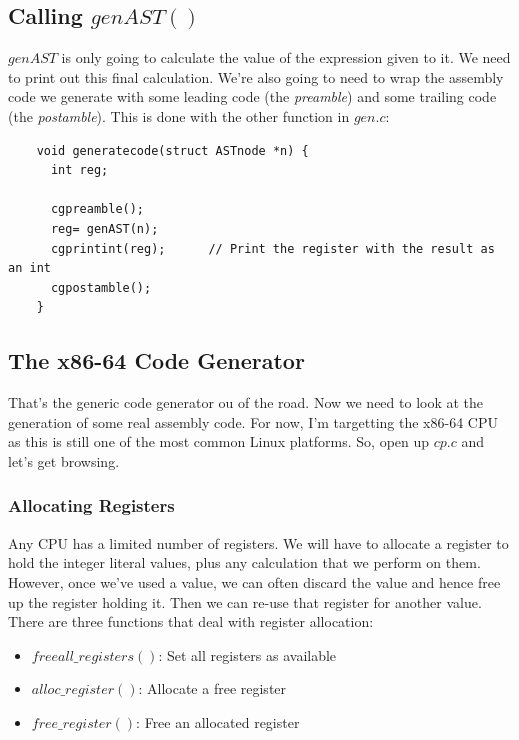 \documentclass[journal, onecolumn, 12pt]{IEEEtran}
\begin{document}
\subsection{Calling $genAST()$}

$genAST$ is only going to calculate the value of the expression given to it. We need to print out this final calculation. We're also going to need to wrap the assembly code we generate with some leading code (the \textit{preamble}) and some trailing code (the \textit{postamble}). This is done with the other function in $gen.c$:

\begin{lstlisting}
    void generatecode(struct ASTnode *n) {
      int reg;
    
      cgpreamble();
      reg= genAST(n);
      cgprintint(reg);      // Print the register with the result as an int
      cgpostamble();
    }  
\end{lstlisting}

\subsection{The x86-64 Code Generator}

That's the generic code generator ou of the road. Now we need to look at the generation of some real assembly code. For now, I'm targetting the x86-64 CPU as this is still one of the most common Linux platforms. So, open up $cp.c$ and let's get browsing.

\subsubsection{Allocating Registers}

Any CPU has a limited number of registers. We will have to allocate a register to hold the integer literal values, plus any calculation that we perform on them. However, once we've used a value, we can often discard the value and hence free up the register holding it. Then we can re-use that register for another value. There are three functions that deal with register allocation:

\begin{itemize}
  \item $freeall\_registers()$: Set all registers as available
  \item $alloc\_register()$: Allocate a free register
  \item $free\_register()$: Free an allocated register
\end{itemize}
\end{document}
